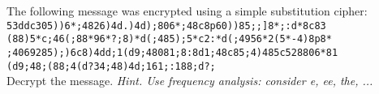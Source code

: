 \begin{problem}
The following message was encrypted using a simple substitution cipher:\\[2ex]
\noindent
\texttt{53ddc305))6*;4826)4d.)4d);806*;48c8p60))85;;]8*;:d*8c83}\\
\texttt{(88)5*c;46(;88*96*?;8)*d(;485);5*c2:*d(;4956*2(5*-4)8p8*}\\
\texttt{;4069285);)6c8)4dd;1(d9;48081;8:8d1;48c85;4)485c528806*81}\\
\texttt{(d9;48;(88;4(d?34;48)4d;161;:188;d?;}\\[2ex]
Decrypt the message.  \emph{Hint. Use frequency analysis: consider e,
ee, the, ...}
\end{problem}
